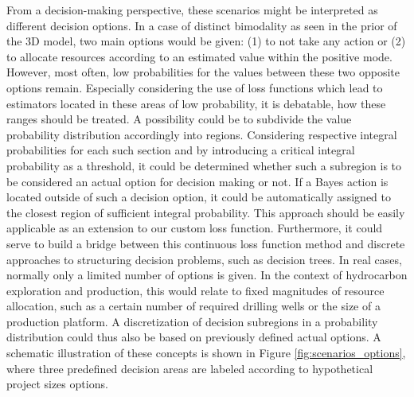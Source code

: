 	From a decision-making perspective, these scenarios might be interpreted as different decision options. In a case of distinct bimodality as seen in the prior of the 3D model, two main options would be given: (1) to not take any action or (2) to allocate resources according to an estimated value within the positive mode. However, most often, low probabilities for the values between these two opposite options remain. Especially considering the use of loss functions which lead to estimators located in these areas of low probability, it is debatable, how these ranges should be treated. A possibility could be to subdivide the value probability distribution accordingly into regions. Considering respective integral probabilities for each such section and by introducing a critical integral probability as a threshold, it could be determined whether such a subregion is to be considered an actual option for decision making or not. If a Bayes action is located outside of such a decision option, it could be automatically assigned to the closest region of sufficient integral probability. This approach should be easily applicable as an extension to our custom loss function. Furthermore, it could serve to build a bridge between this continuous loss function method and discrete approaches to structuring decision problems, such as decision trees. In real cases, normally only a limited number of options is given. In the context of hydrocarbon exploration and production, this would relate to fixed magnitudes of resource allocation, such as a certain number of required drilling wells or the size of a production platform. A discretization of decision subregions in a probability distribution could thus also be based on previously defined actual options. A schematic illustration of these concepts is shown in Figure \ref{fig:scenarios_options}, where three predefined decision areas are labeled according to hypothetical project sizes options.
